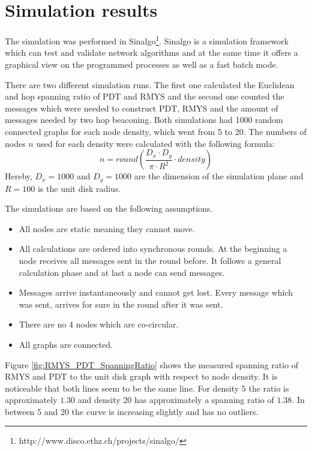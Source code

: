 \section{Simulation results}
The simulation was performed in Sinalgo\footnote{http://www.disco.ethz.ch/projects/sinalgo/}.
Sinalgo is a simulation framework which can test and validate network algorithms and at the same time it offers a graphical view on the programmed processes as well as a fast batch mode.

There are two different simulation runs.
The first one calculated the Euclidean and hop spanning ratio of PDT and RMYS and the second one counted the messages which were needed to construct PDT, RMYS and the amount of messages needed by two hop beaconing.
Both simulations had 1000 random connected graphs for each node density, which went from 5 to 20.
The numbers of nodes $n $ used for each density were calculated with the following formula:
\begin{equation*}
n =round( \frac{D_x \cdot D_y}{\pi \cdot R^2} \cdot density)
\end{equation*}
Hereby, $D_x=1000 $ and $D_y=1000 $ are the dimension of the simulation plane and $R = 100 $ is the unit disk radius.

\bigskip

The simulations are based on the following assumptions.
\begin{itemize}
\item All nodes are static meaning they cannot move.
\item All calculations are ordered into synchronous rounds. 
At the beginning a node receives all messages sent in the round before.
It follows a general calculation phase and at last a node can send messages.
\item Messages arrive instantaneously and cannot get lost.
Every message which was sent, arrives for sure in the round after it was sent.
\item There are no 4 nodes which are co-circular.
\item All graphs are connected.
\end{itemize}


Figure \ref{fig:RMYS_PDT_SpanningRatio} shows the measured spanning ratio of RMYS and PDT to the unit disk graph with respect to node density.
It is noticeable that both lines seem to be the same line.
For density $5 $ the ratio is approximately $1.30 $ and density 20 has approximately a spanning ratio of $1.38 $.
In between 5 and 20 the curve is increasing slightly and has no outliers.

